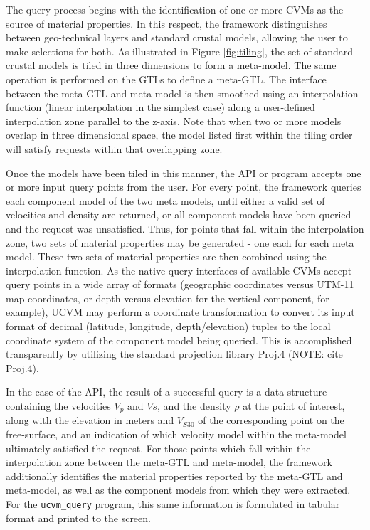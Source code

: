 The query process begins with the identification of one or more CVMs as the source of material properties. In this respect, the framework distinguishes between geo-technical layers and standard crustal models, allowing the user to make selections for both. As illustrated in Figure \ref{fig:tiling}, the set of standard crustal models is tiled in three dimensions to form a meta-model. The same operation is performed on the GTLs to define a meta-GTL. The interface between the meta-GTL and meta-model is then smoothed using an interpolation function (linear interpolation in the simplest case) along a user-defined interpolation zone parallel to the z-axis. Note that when two or more models overlap in three dimensional space, the model listed first within the tiling order will satisfy requests within that overlapping zone.

Once the models have been tiled in this manner, the API or program accepts one or more input query points from the user. For every point, the framework queries each component model of the two meta models, until either a valid set of velocities and density are returned, or all component models have been queried and the request was unsatisfied. Thus, for points that fall within the interpolation zone, two sets of material properties may be generated - one each for each meta model. These two sets of material properties are then combined using the interpolation function. As the native query interfaces of available CVMs accept query points in a wide array of formats (geographic coordinates versus UTM-11 map coordinates, or depth versus elevation for the vertical component, for example), UCVM may perform a coordinate transformation to convert its input format of decimal (latitude, longitude, depth/elevation) tuples to the local coordinate system of the component model being queried. This is accomplished transparently by utilizing the standard projection library Proj.4 (NOTE: cite Proj.4).

In the case of the API, the result of a successful query is a data-structure containing the velocities $V_{p}$ and $V{s}$, and the density $\rho$ at the point of interest, along with the elevation in meters and $V_{S30}$ of the corresponding point on the free-surface, and an indication of which velocity model within the meta-model ultimately satisfied the request. For those points which fall within the interpolation zone between the meta-GTL and meta-model, the framework additionally identifies the material properties reported by the meta-GTL and meta-model, as well as the component models from which they were extracted. For the \texttt{ucvm\_query} program, this same information is formulated in tabular format and printed to the screen.


